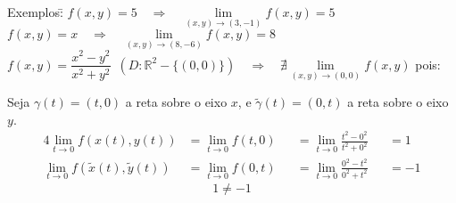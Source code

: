 \documentclass{article}
\begin{document}
\pagebreak

\begin{tabbing}
  Exemplos:\enspace\= $f(x,y) = 5 \quad \Rightarrow \quad \lim\limits_{(x,y) \to (3,-1)} f(x,y) = 5$ \\[10pt]
  \> $f(x,y) = x \quad \Rightarrow \quad \lim\limits_{(x,y) \to (8,-6)} f(x,y) = 8$ \\[10pt]
  \> $f(x,y) = \dfrac{x^2 - y^2}{x^2 + y^2} \enspace \left(D: \mathbb{R}^2 - \{ (0,0) \} \right) \quad \Rightarrow \quad \nexists \lim\limits_{(x,y) \to (0,0)} f(x,y) $ pois: \\[5pt]
  \>\quad\begin{minipage}{400px}
      Seja $\gamma(t) = (t, 0)$ a reta sobre o eixo $x$, e $\widetilde{\gamma}(t) = (0, t)$ a reta sobre o eixo $y$.
      \begin{alignat*}{4}
        \lim_{t\to0} f(x(t), y(t)) &= \lim_{t\to0} f(t, 0) &&= \lim_{t\to0} \frac{t^2 - 0^2}{t^2 + 0^2} &&= 1\\[5pt]
        \lim_{t\to0} f(\widetilde{x}(t), \widetilde{y}(t)) &= \lim_{t\to0} f(0, t) &&= \lim_{t\to0} \frac{0^2 - t^2}{0^2 + t^2} &&= -1
      \end{alignat*}
      \[ 1 \neq -1 \]
      \centering
\end{minipage}
\end{tabbing}
\end{document}
